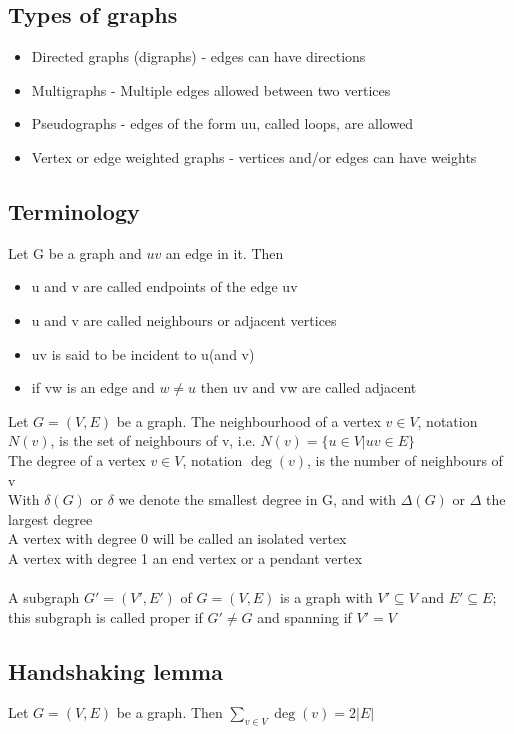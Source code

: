 \documentclass{article}[18pt]
\begin{document}
\subsection{Types of graphs}
\begin{itemize}
	\item Directed graphs (digraphs) - edges can have directions
	\item Multigraphs - Multiple edges allowed between two vertices
	\item Pseudographs - edges of the form uu, called loops, are allowed
	\item Vertex or edge weighted graphs - vertices and/or edges can have weights
\end{itemize}
\subsection{Terminology}
Let G be a graph and $uv$ an edge in it. Then
\begin{itemize}
	\item u and v are called endpoints of the edge uv
	\item u and v are called neighbours or adjacent vertices
	\item uv is said to be incident to u(and v)
	\item if vw is an edge and $w\neq u$ then uv and vw are called adjacent
\end{itemize}
Let $G=(V,E)$ be a graph. The neighbourhood of a vertex $v\in V$, notation $N(v)$, is the set of neighbours of v, i.e. $N(v)=\{u\in V|uv\in E\}$\\
The degree of a vertex $v\in V$, notation $\operatorname{deg}(v)$, is the number of neighbours of v\\
With $\delta(G)$ or $\delta$ we denote the smallest degree in G, and with $\Delta(G)$ or $\Delta$ the largest degree\\
A vertex with degree 0 will be called an isolated vertex\\
A vertex with degree 1 an end vertex or a pendant vertex\\
\\
A subgraph $G'=(V',E')$ of $G=(V,E)$ is a graph with $V'\subseteq V$ and $E'\subseteq E$; this subgraph is called proper if $G'\neq G$ and spanning if $V'=V$
\subsection{Handshaking lemma}
Let $G=(V,E)$ be a graph. Then \(\sum_{v \in V} \operatorname{deg}(v)=2|E|\)
\end{document}
